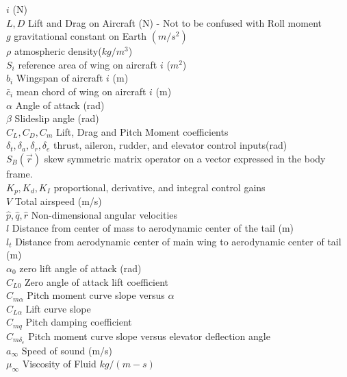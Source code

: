 \begin{tabbing}
  $i$ (N) \\
  $L,D$ \> Lift and Drag on Aircraft (N) - Not to be confused with Roll moment\\
  $g$ \> gravitational constant on Earth $(m/s^2)$ \\
  $\rho$ \> atmospheric density($kg/m^3$) \\
  $S_i$ \> reference area of wing on aircraft $i$ ($m^2$) \\
  $b_i$ \> Wingspan of aircraft $i$ (m) \\
  $\bar{c}_i$ \> mean chord of wing on aircraft $i$ (m) \\
  $\alpha$ \> Angle of attack (rad) \\
  $\beta$ \> Slideslip angle (rad) \\
  $C_L,C_D,C_m$ \> Lift, Drag and Pitch Moment coefficients \\
  $\delta_t,\delta_a,\delta_r,\delta_e$ \> thrust, aileron, rudder,
  and elevator control inputs(rad) \\
  $S_B(\vec{r})$ \> skew symmetric matrix operator on a vector
  expressed in the body frame. \\
  $K_p,K_d,K_I$ \> proportional, derivative, and integral control
  gains\\
  $V$ \> Total airspeed (m/s) \\
  $\hat{p},\hat{q},\hat{r}$ \> Non-dimensional angular velocities \\
  $l$ \> Distance from center of mass to aerodynamic center of the
  tail (m) \\
  $l_t$ \> Distance from aerodynamic center of main wing to
  aerodynamic center of tail (m) \\
  $\alpha_0$ \> zero lift angle of attack (rad) \\
  $C_{L0}$ \> Zero angle of attack lift coefficient \\
  $C_{m\alpha}$ \> Pitch moment curve slope versus $\alpha$ \\
  $C_{L\alpha}$ \> Lift curve slope \\
  $C_{mq}$ \> Pitch damping coefficient \\
  $C_{m\delta_e}$ \> Pitch moment curve slope versus elevator
  deflection angle \\
  $a_{\infty}$ \> Speed of sound (m/s) \\
  $\mu_{\infty}$ \> Viscosity of Fluid $kg/(m-s)$ \\
\end{tabbing}

